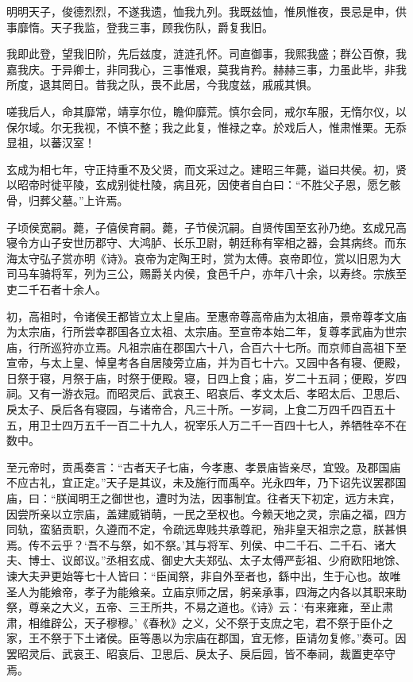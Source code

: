 \documentclass[12pt,UTF8]{ctexbook}
\begin{document}
明明天子，俊德烈烈，不遂我遗，恤我九列。我既兹恤，惟夙惟夜，畏忌是申，供事靡惰。天子我监，登我三事，顾我伤队，爵复我旧。



我即此登，望我旧阶，先后兹度，涟涟孔怀。司直御事，我熙我盛；群公百僚，我嘉我庆。于异卿士，非同我心，三事惟艰，莫我肯矜。赫赫三事，力虽此毕，非我所度，退其罔日。昔我之队，畏不此居，今我度兹，戚戚其惧。



嗟我后人，命其靡常，靖享尔位，瞻仰靡荒。慎尔会同，戒尔车服，无惰尔仪，以保尔域。尔无我视，不慎不整；我之此复，惟禄之幸。於戏后人，惟肃惟栗。无忝显祖，以蕃汉室！



玄成为相七年，守正持重不及父贤，而文采过之。建昭三年薨，谥曰共侯。初，贤以昭帝时徙平陵，玄成别徙杜陵，病且死，因使者自白曰：“不胜父子恩，愿乞骸骨，归葬父墓。”上许焉。



子顷侯宽嗣。薨，子僖侯育嗣。薨，子节侯沉嗣。自贤传国至玄孙乃绝。玄成兄高寝令方山子安世历郡守、大鸿胪、长乐卫尉，朝廷称有宰相之器，会其病终。而东海太守弘子赏亦明《诗》。哀帝为定陶王时，赏为太傅。哀帝即位，赏以旧恩为大司马车骑将军，列为三公，赐爵关内侯，食邑千户，亦年八十余，以寿终。宗族至吏二千石者十余人。



初，高祖时，令诸侯王都皆立太上皇庙。至惠帝尊高帝庙为太祖庙，景帝尊孝文庙为太宗庙，行所尝幸郡国各立太祖、太宗庙。至宣帝本始二年，复尊孝武庙为世宗庙，行所巡狩亦立焉。凡祖宗庙在郡国六十八，合百六十七所。而京师自高祖下至宣帝，与太上皇、悼皇考各自居陵旁立庙，并为百七十六。又园中各有寝、便殿，日祭于寝，月祭于庙，时祭于便殿。寝，日四上食；庙，岁二十五祠；便殿，岁四祠。又有一游衣冠。而昭灵后、武哀王、昭哀后、孝文太后、孝昭太后、卫思后、戾太子、戾后各有寝园，与诸帝合，凡三十所。一岁祠，上食二万四千四百五十五，用卫士四万五千一百二十九人，祝宰乐人万二千一百四十七人，养牺牲卒不在数中。



至元帝时，贡禹奏言：“古者天子七庙，今孝惠、孝景庙皆亲尽，宜毁。及郡国庙不应古礼，宜正定。”天子是其议，未及施行而禹卒。光永四年，乃下诏先议罢郡国庙，曰：“朕闻明王之御世也，遭时为法，因事制宜。往者天下初定，远方未宾，因尝所亲以立宗庙，盖建威销萌，一民之至权也。今赖天地之灵，宗庙之福，四方同轨，蛮貊贡职，久遵而不定，令疏远卑贱共承尊祀，殆非皇天祖宗之意，朕甚惧焉。传不云乎？‘吾不与祭，如不祭。’其与将军、列侯、中二千石、二千石、诸大夫、博士、议郎议。”丞相玄成、御史大夫郑弘、太子太傅严彭祖、少府欧阳地馀、谏大夫尹更始等七十人皆曰：“臣闻祭，非自外至者也，繇中出，生于心也。故唯圣人为能飨帝，孝子为能飨亲。立庙京师之居，躬亲承事，四海之内各以其职来助祭，尊亲之大义，五帝、三王所共，不易之道也。《诗》云：‘有来雍雍，至止肃肃，相维辟公，天子穆穆。’《春秋》之义，父不祭于支庶之宅，君不祭于臣仆之家，王不祭于下土诸侯。臣等愚以为宗庙在郡国，宜无修，臣请勿复修。”奏可。因罢昭灵后、武哀王、昭哀后、卫思后、戾太子、戾后园，皆不奉祠，裁置吏卒守焉。
\end{document}
